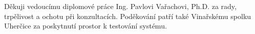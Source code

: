 \documentclass[a4paper,12pt]{article}
\begin{document}
\titulnistrana

\zadani
%

\prohlaseni

\abstraktaklicovaslova


\clearpage
\thispagestyle{empty}
Děkuji vedoucímu diplomové práce Ing. Pavlovi Vařachovi, Ph.D. za rady, trpělivost a ochotu při konzultacích. Poděkování patří také Vinařskému spolku Uherčice za poskytnutí prostor k testování systému.



\obsah  %


\OdsazovaniOdstavcuStart %


\OdsazovaniOdstavcuStop


\seznamlitbib
\end{document}
